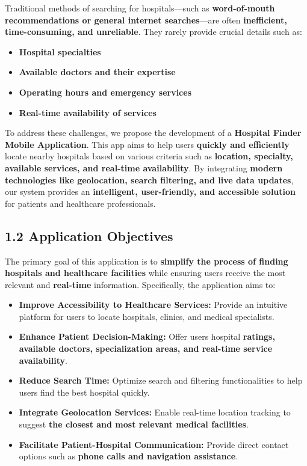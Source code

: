 \documentclass[12pt]{report}
\begin{document}
\noindent Traditional methods of searching for hospitals—such as \textbf{word-of-mouth recommendations or general internet searches}—are often \textbf{inefficient, time-consuming, and unreliable}. They rarely provide crucial details such as:
\begin{itemize}
	\item \textbf{Hospital specialties}
	\item \textbf{Available doctors and their expertise}
	\item \textbf{Operating hours and emergency services}
	\item \textbf{Real-time availability of services}
\end{itemize}

\noindent To address these challenges, we propose the development of a \textbf{Hospital Finder Mobile Application}. This app aims to help users \textbf{quickly and efficiently} locate nearby hospitals based on various criteria such as \textbf{location, specialty, available services, and real-time availability}. By integrating \textbf{modern technologies like geolocation, search filtering, and live data updates}, our system provides an \textbf{intelligent, user-friendly, and accessible solution} for patients and healthcare professionals.

\subsection*{\textbf{1.2 Application Objectives}}

The primary goal of this application is to \textbf{simplify the process of finding hospitals and healthcare facilities} while ensuring users receive the most relevant and \textbf{real-time} information. Specifically, the application aims to:

\begin{itemize}
	\item \textbf{Improve Accessibility to Healthcare Services:} Provide an intuitive platform for users to locate hospitals, clinics, and medical specialists.
	\item \textbf{Enhance Patient Decision-Making:} Offer users hospital \textbf{ratings, available doctors, specialization areas, and real-time service availability}.
	\item \textbf{Reduce Search Time:} Optimize search and filtering functionalities to help users find the best hospital quickly.
	\item \textbf{Integrate Geolocation Services:} Enable real-time location tracking to suggest \textbf{the closest and most relevant medical facilities}.
	\item \textbf{Facilitate Patient-Hospital Communication:} Provide direct contact options such as \textbf{phone calls and navigation assistance}.
\end{itemize}
\end{document}
